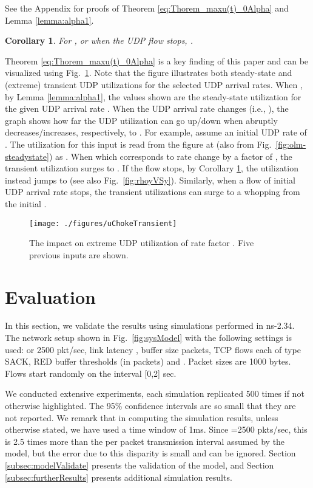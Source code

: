 \documentclass{IEEEtran}
\begin{document}
    See the Appendix for proofs of Theorem \ref{eq:Thorem_maxu(t)_0Alpha} and Lemma \ref{lemma:alpha1}.
    \newtheorem{corollary}{Corollary}
     \begin{corollary}\label{cor:alpha0}
        For , or when the UDP flow stops, .
    \end{corollary}

    Theorem \ref{eq:Thorem_maxu(t)_0Alpha} is a key finding of this paper and can be visualized using Fig.~\ref{fig:uChokeTransientTheory}. Note that the figure illustrates both steady-state and (extreme) transient UDP utilizations for the selected UDP arrival rates. When , by Lemma \ref{lemma:alpha1}, the values shown are the steady-state utilization  for the given UDP arrival rate .  When the UDP arrival rate   changes (i.e., ),  the graph shows how far the UDP utilization can go up/down when   abruptly decreases/increases, respectively, to . For example, assume an initial UDP rate of . The utilization for this input is read from the figure at  (also from Fig.~\ref{fig:olm-steadystate}) as . When  which corresponds to rate change by a factor of , the transient utilization surges to . If the flow stops, by Corollary \ref{cor:alpha0}, the utilization instead jumps to  (see also Fig.~\ref{fig:rhoyVSy}). Similarly, when a flow of initial UDP arrival rate  stops, the transient utilizations can surge to a whopping   from the initial . 

    \begin{figure}[thb!]
            \centering
            \texttt{[image: ./figures/uChokeTransient]}\caption{The impact on extreme UDP utilization of rate factor . Five previous inputs  are shown.}
            \label{fig:uChokeTransientTheory}
    \end{figure}

    \section{Evaluation}\label{sec:evaluation}

In this section, we validate the results using simulations performed in ns-2.34. The network setup shown in Fig.~\ref{fig:sysModel} with the following settings is used:  or 2500 pkt/sec, link latency , buffer size  packets,  TCP flows each of type SACK, RED buffer thresholds (in packets)  and . Packet sizes are 1000 bytes. Flows start randomly on the interval [0,2] sec.

We conducted extensive experiments,  each simulation replicated 500 times if not otherwise highlighted. The 95\% confidence intervals are so small that they are not reported. We remark that in computing the simulation results, unless otherwise stated, we have used a time window of 1ms. Since =2500 pkts/sec, this is 2.5 times more than the per packet transmission interval assumed by the model, but the error due to this disparity is small and can be ignored.
Section \ref{subsec:modelValidate} presents the validation of the model, and Section \ref{subsec:furtherResults} presents additional simulation results.
\end{document}
